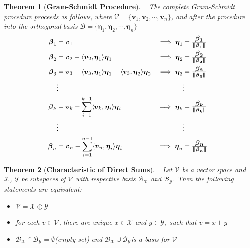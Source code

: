 \documentclass[10.5pt]{article}
\newtheorem{theo}{Theorem}
\begin{document}
\begin{theo}[\textbf{Gram-Schmidt Procedure}]
~ The complete Gram-Schmidt procedure proceeds as follows, where $\mathcal{V}=\{\boldsymbol {v}_{1},\boldsymbol {v}_{2},\cdots ,\boldsymbol {v}_{n}\}$, and after the procedure into the orthogonal basis $\mathcal{B}=\{\boldsymbol {\eta }_{1},\boldsymbol {\eta }_{2},\cdots ,\boldsymbol {\eta }_{n}\}$\\
\begin{align*}
\displaystyle {\boldsymbol {\beta }}_{1}&={\boldsymbol {v}}_{1} &\implies \displaystyle {\boldsymbol {\eta }}_{1}&=\boldsymbol {\beta _{1} \over \|{\boldsymbol {\beta }}_{1}\|} \\
\displaystyle {\boldsymbol {\beta }}_{2}&={\boldsymbol {v}}_{2}-\langle {\boldsymbol {v}}_{2},{\boldsymbol {\eta }}_{1}\rangle {\boldsymbol {\eta }}_{1} &\implies \displaystyle {\boldsymbol {\eta }}_{2}&=\boldsymbol {\beta _{2} \over \|{\boldsymbol {\beta }}_{2}\|}\\
\displaystyle {\boldsymbol {\beta }}_{3}&={\boldsymbol {v}}_{3}-\langle {\boldsymbol {v}}_{3},{\boldsymbol {\eta }}_{1}\rangle {\boldsymbol {\eta }}_{1}-\langle {\boldsymbol {v}}_{3},{\boldsymbol {\eta }}_{2}\rangle {\boldsymbol {\eta }}_{2} &\implies \displaystyle {\boldsymbol {\eta }}_{3}&=\boldsymbol {\beta _{3} \over \|{\boldsymbol {\beta }}_{3}\|}\\
&\vdots & ~ &\vdots \\
\displaystyle {\boldsymbol {\beta }}_{k}&={\boldsymbol {v}}_{k}-\sum _{i=1}^{k-1}\langle {\boldsymbol {v}}_{k},{\boldsymbol {\eta }}_{i}\rangle {\boldsymbol {\eta }}_{i} &\implies \displaystyle {\boldsymbol {\eta }}_{k}&=\boldsymbol {\beta _{k} \over \|{\boldsymbol {\beta }}_{k}\|}\\
&\vdots & ~ &\vdots \\
\displaystyle {\boldsymbol {\beta }}_{n}&={\boldsymbol {v}}_{n}-\sum _{i=1}^{n-1}\langle {\boldsymbol {v}}_{n},{\boldsymbol {\eta }}_{i}\rangle {\boldsymbol {\eta }}_{i} &\implies \displaystyle {\boldsymbol {\eta }}_{n}&=\boldsymbol {\beta _{n} \over \|{\boldsymbol {\beta }}_{n}\|}\\
\end{align*}
\end{theo}

\begin{theo}[\textbf{Characteristic of Direct Sums}]
~ Let $\mathcal{V}$ be a vector space and $\mathcal{X}$, $\mathcal{Y}$ be subspaces of $\mathcal{V}$ with respective basis $\mathcal{B}_{\mathcal{X}}$ and $\mathcal{B}_{\mathcal{Y}}$. Then the following statements are equivalent:
\begin{itemize}
\item $\mathcal{V}=\mathcal{X}\oplus \mathcal{Y}$
\item \textit{for each $v\in \mathcal{V}$, there are unique $x\in \mathcal{X}$ and $y\in \mathcal{Y}$, such that $v=x+y$}
\item \textit{$\mathcal{B}_{\mathcal{X}}\cap \mathcal{B}_{\mathcal{Y}}=\emptyset$(empty set) and $\mathcal{B}_{\mathcal{X}}\cup \mathcal{B}_{\mathcal{Y}}$is a basis for $\mathcal{V}$}
\end{itemize}
\end{theo}
\end{document}
